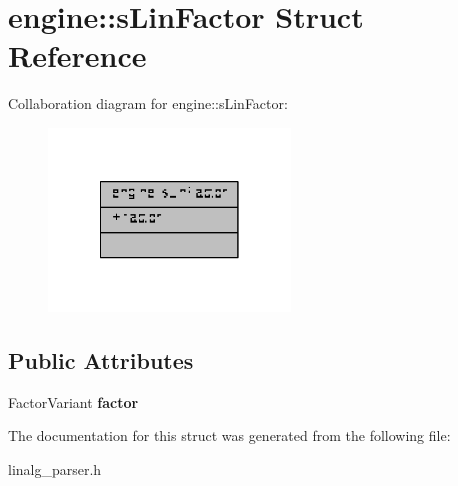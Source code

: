 \hypertarget{structengine_1_1sLinFactor}{\section{engine\-:\-:s\-Lin\-Factor Struct Reference}
\label{structengine_1_1sLinFactor}
}


Collaboration diagram for engine\-:\-:s\-Lin\-Factor\-:
\nopagebreak
\begin{figure}[H]
\begin{center}
\leavevmode
\includegraphics[width=182pt]{structengine_1_1sLinFactor__coll__graph}
\end{center}
\end{figure}
\subsection*{Public Attributes}
\begin{DoxyCompactItemize}
\item 
\hypertarget{structengine_1_1sLinFactor_a1104c8cd6e2f08a00e717a2b3dc4d4c4}{Factor\-Variant {\bfseries factor}}\label{structengine_1_1sLinFactor_a1104c8cd6e2f08a00e717a2b3dc4d4c4}

\end{DoxyCompactItemize}


The documentation for this struct was generated from the following file\-:\begin{DoxyCompactItemize}
\item 
linalg\-\_\-parser.\-h\end{DoxyCompactItemize}
